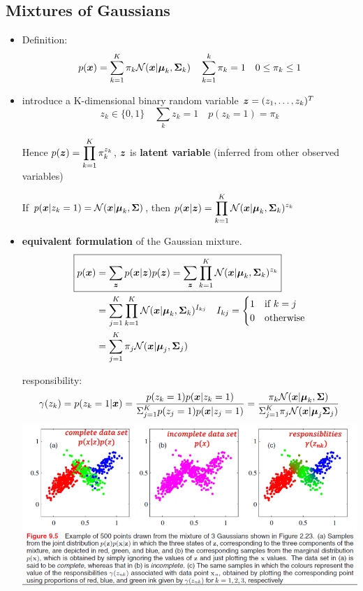 \documentclass[11pt]{article}
\begin{document}
\subsection{Mixtures of Gaussians}
\label{sec:org3ecfc9b}
\begin{itemize}
\item Definition: 
\begin{equation*}
p(\boldsymbol{x})=\displaystyle\sum_{k=1}^K\pi_k\mathcal{N}
(\boldsymbol{x}|\boldsymbol{\mu}_k,\boldsymbol{\Sigma}_k)\quad \displaystyle\sum_{k=1}^k\pi_k=1
\quad 0\le\pi_k\le1
\end{equation*}
\item introduce a K-dimensional binary random variable \(\boldsymbol{z}=(z_1,\dots,z_k)^T\)
\begin{equation*}
z_k\in\{0,1\}\quad \displaystyle\sum_kz_k=1\quad p(z_k=1)=\pi_k
\end{equation*}

Hence \(p(\boldsymbol{z})
     =\displaystyle\prod_{k=1}^K\pi_k^{z_k}\), \(\boldsymbol{z}\) is \textbf{latent variable} (inferred
from other observed variables)

If \(p(\boldsymbol{x}|z_k=1)=\mathcal{N}(\boldsymbol{x}|\boldsymbol{\mu}_k,\boldsymbol{\Sigma})\), then
\(p(\boldsymbol{x}|\boldsymbol{z})=\displaystyle\prod_{k=1}^K\mathcal{N}(\boldsymbol{x}|\boldsymbol{\mu}_k,
     \boldsymbol{\Sigma}_k)^{z_k}\)
\item \textbf{equivalent formulation} of the Gaussian mixture.
\begin{align*}
\Aboxed{
p(\bl{x})&=\displaystyle\sum_{\bl{z}}p(\bl{x}|\bl{z})p(\bl{z})
=\displaystyle\sum_{\bl{z}}\displaystyle\prod_{k=1}^K
\mathcal{N}(\bl{x}|\bl{\mu}_k,\bl{\Sigma}_k)^{z_k}}\\
&=\displaystyle\sum_{j=1}^K\displaystyle\prod_{k=1}^K\mathcal{N}(\bl{x}|\bl{\mu}_k,
\bl{\Sigma}_k)^{I_{kj}}\quad I_{kj}=
\begin{cases}
1&\text{if } k=j\\
0&\text{otherwise}
\end{cases}\\
&=\displaystyle\sum_{j=1}^K\pi_j\mathcal{N}(\bl{x}|\bl{\mu}_j,\bl{\Sigma}_j)
\end{align*}

responsibility:
\begin{equation*}
\gamma(z_k)=p(z_k=1|\boldsymbol{x})=\frac{p(z_k=1)p(\boldsymbol{x}|z_k=1)}{\displaystyle\Sigma_{j=1}^Kp(z_j=1)p(\boldsymbol{x}|z_j=1)}
=\frac{ \pi_k\mathcal{N}(\boldsymbol{x}|\boldsymbol{\mu}_k,\boldsymbol{\Sigma})}{\displaystyle\Sigma_{j=1}^K\pi_j\mathcal{N}(\boldsymbol{x}|\boldsymbol{\mu}_j
\boldsymbol{\Sigma}_j)}
\end{equation*}
\includegraphics[width=130mm]{GMM}
\end{itemize}
\end{document}
